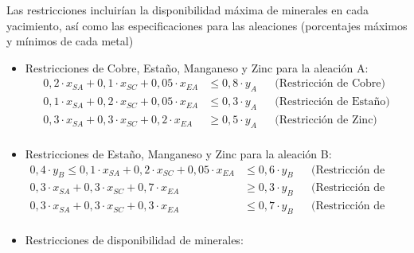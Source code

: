 \documentclass[../main.tex]{subfiles}
\begin{document}
\begin{exercise}
\begin{enumerate}
                    Las restricciones incluirían la disponibilidad máxima de minerales en cada yacimiento, así como las especificaciones para las aleaciones (porcentajes máximos y mínimos de cada metal)
                    \begin{itemize}
                        \item Restricciones de Cobre, Estaño, Manganeso y Zinc para la aleación A:
                            \begin{equation}
                                \begin{aligned}
                                    0,2 \cdot x_{SA} + 0,1 \cdot x_{SC} + 0,05 \cdot x_{EA} &\leq 0,8 \cdot y_A && \text{(Restricción de Cobre)} \\
                                    0,1 \cdot x_{SA} + 0,2 \cdot x_{SC} + 0,05 \cdot x_{EA} &\leq 0,3 \cdot y_A && \text{(Restricción de Estaño)}\\
                                    0,3 \cdot x_{SA} + 0,3 \cdot x_{SC} + 0,2 \cdot x_{EA} &\geq 0,5 \cdot y_A && \text{(Restricción de Zinc)}\\
                                \end{aligned}
                            \end{equation}
                        \item Restricciones de Estaño, Manganeso y Zinc para la aleación B:
                            \begin{equation}
                                \begin{aligned}
                                    0,4 \cdot y_B \leq 0,1 \cdot x_{SA} + 0,2 \cdot x_{SC} + 0,05 \cdot x_{EA} &\leq 0,6 \cdot y_B && \text{(Restricción de Estaño)}\\
                                    0,3 \cdot x_{SA} + 0,3 \cdot x_{SC} + 0,7 \cdot x_{EA} &\geq 0,3 \cdot y_B && \text{(Restricción de Manganeso)}\\
                                    0,3 \cdot x_{SA} + 0,3 \cdot x_{SC} + 0,3 \cdot x_{EA} &\leq 0,7 \cdot y_B && \text{(Restricción de Zinc)}\\
                                \end{aligned}
                            \end{equation}
                        \item Restricciones de disponibilidad de minerales:
                            \begin{equation}
                                \begin{aligned}

\end{aligned}
\end{equation}
\end{itemize}
\end{enumerate}
\end{exercise}
\end{document}
